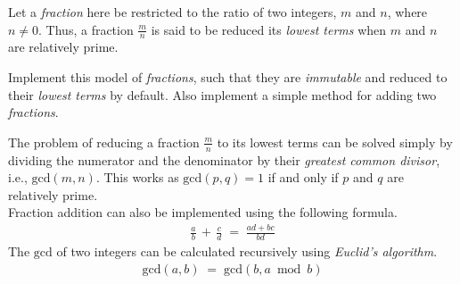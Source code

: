 
\problem Let a \textit{fraction} here be restricted to the ratio of two integers, $m$ and $n$, where $n \neq 0$. Thus, a fraction $\frac{m}{n}$ is
said to be reduced its \textit{lowest terms} when $m$ and $n$ are relatively prime.

Implement this model of \textit{fractions}, such that they are \textit{immutable} and reduced to their \textit{lowest terms} by default. Also
implement a simple method for adding two \textit{fractions}.

\solution
The problem of reducing a fraction $\frac{m}{n}$ to its lowest terms can be solved simply by dividing the numerator and the denominator by their
\textit{greatest common divisor}, i.e., $\mathrm{gcd}(m, n)$. This works as $\mathrm{gcd}(p, q) = 1$ if and only if $p$ and $q$ are relatively prime.
\\
Fraction addition can also be implemented using the following formula.
\begin{align*}
	\frac{a}{b} \,+\, \frac{c}{d} \;=\; \frac{ad + bc}{bd}
\end{align*}
The $\mathrm{gcd}$ of two integers can be calculated recursively using \textit{Euclid's algorithm}.
\begin{align*}
	\mathrm{gcd}(a, b) \;=\; \mathrm{gcd}(b, a \bmod b)
\end{align*}
